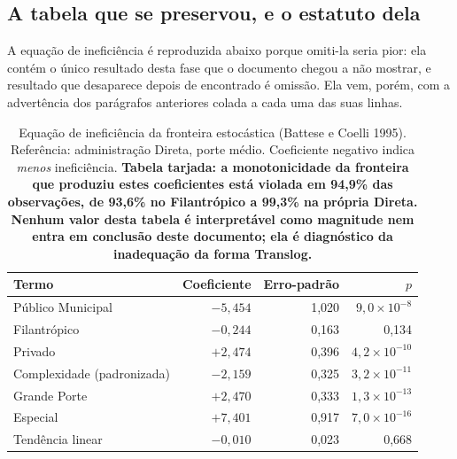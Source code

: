 \subsection*{A tabela que se preservou, e o estatuto dela}

A equação de ineficiência é reproduzida abaixo porque omiti-la seria
pior: ela contém o único resultado desta fase que o documento chegou a
não mostrar, e resultado que desaparece depois de encontrado é omissão.
Ela vem, porém, com a advertência dos parágrafos anteriores colada a
cada uma das suas linhas.

\begin{table}[H]
\centering
\caption{Equação de ineficiência da fronteira estocástica (Battese e
Coelli 1995). Referência: administração Direta, porte médio.
Coeficiente negativo indica \emph{menos} ineficiência.
\textbf{Tabela tarjada: a monotonicidade da fronteira que produziu estes
coeficientes está violada em 94,9\% das observações, de 93,6\% no
Filantrópico a 99,3\% na própria Direta. Nenhum valor desta tabela é
interpretável como magnitude nem entra em conclusão deste documento; ela
é diagnóstico da inadequação da forma Translog.}}
\label{tab:equacaoinef}
\small
\begin{tabular}{lrrr}
\toprule
Termo & Coeficiente & Erro-padrão & $p$ \\
\midrule
Público Municipal        & $-5{,}454$ & 1,020 & $9{,}0\times10^{-8}$ \\
Filantrópico             & $-0{,}244$ & 0,163 & 0,134 \\
Privado                  & $+2{,}474$ & 0,396 & $4{,}2\times10^{-10}$ \\
Complexidade (padronizada) & $-2{,}159$ & 0,325 & $3{,}2\times10^{-11}$ \\
Grande Porte             & $+2{,}470$ & 0,333 & $1{,}3\times10^{-13}$ \\
Especial                 & $+7{,}401$ & 0,917 & $7{,}0\times10^{-16}$ \\
Tendência linear         & $-0{,}010$ & 0,023 & 0,668 \\
\bottomrule
\end{tabular}
\end{table}

